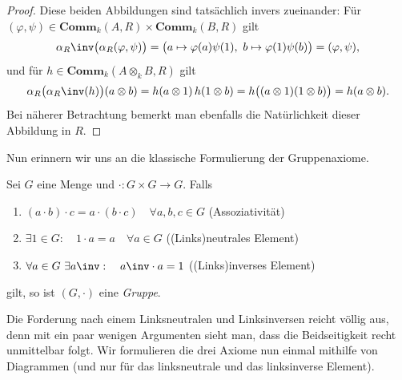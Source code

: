 \documentclass[11pt]{article}
\newcommand{\Comm}{\mathbf{Comm}}
\begin{document}
\begin{lemma}
\begin{proof}
        
        
        
        
        
        
        
        
        
        
        
        
        
        
        Diese beiden Abbildungen sind tatsächlich invers zueinander: Für $(\varphi,\psi)\in \Comm_k(A,R) \times \Comm_k(B,R)$ gilt
        $$\alpha_R\inv\big(\alpha_R(\varphi,\psi)\big) = \big(a\mapsto \varphi(a)\psi(1),\ b\mapsto \varphi(1)\psi(b)\big) = (\varphi,\psi),$$
        und für $h\in\Comm_k(A\otimes_k B,R)$ gilt 
        $$\alpha_R\big(\alpha_R\inv(h)\big)(a\otimes b) = h(a\otimes 1)\,h(1\otimes b) = h\big((a\otimes 1)(1\otimes b)\big) = h(a\otimes b).$$
        Bei näherer Betrachtung bemerkt man ebenfalls die Natürlichkeit dieser Abbildung in $R$. 
    \end{proof}
\end{lemma}


Nun erinnern wir uns an die klassische Formulierung der Gruppenaxiome. 
\begin{definition}[Gruppe I]\Theorem Sei $G$ eine  Menge und $\cdot : G\times G \to G$. Falls
\begin{enumerate}
    \item $(a\cdot b)\cdot c = a\cdot (b\cdot c) \quad \forall a,b,c\in G$ \hfill (Assoziativität)
    \item $\exists 1\in G: \quad  1 \cdot a = a\quad \forall a\in G$ \hfill ((Links)neutrales Element)
    \item $\forall a\in G \ \exists a\inv: \quad a\inv \cdot a = 1$ \hfill ((Links)inverses Element) 
\end{enumerate}
gilt, so ist $(G,\cdot)$ eine \emph{Gruppe}. 
\end{definition}

Die Forderung nach einem Linksneutralen und Linksinversen reicht völlig aus, denn mit ein paar wenigen Argumenten sieht man, dass die Beidseitigkeit recht unmittelbar folgt. Wir formulieren die drei Axiome nun einmal mithilfe von Diagrammen (und nur für das linksneutrale und das linksinverse Element). 
\end{document}
